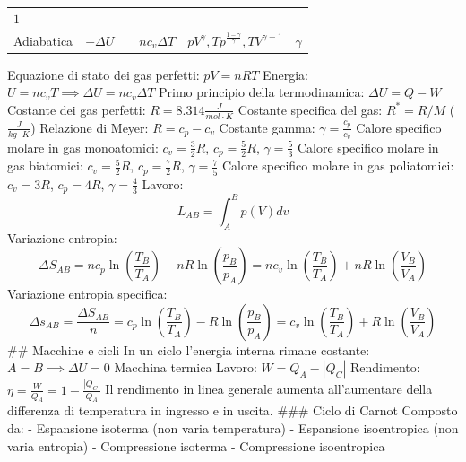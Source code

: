 \begin{longtable}[]{@{}lccccc@{}}
\begin{minipage}[t]{0.05\columnwidth}
\(1\)\strut
\end{minipage}\tabularnewline
\begin{minipage}[t]{0.07\columnwidth}\raggedright
Adiabatica\strut
\end{minipage} & \begin{minipage}[t]{0.13\columnwidth}\centering
\(-\Delta U\)\strut
\end{minipage} & \begin{minipage}[t]{0.09\columnwidth}\centering
0\strut
\end{minipage} & \begin{minipage}[t]{0.09\columnwidth}\centering
\(nc_v\Delta T\)\strut
\end{minipage} & \begin{minipage}[t]{0.39\columnwidth}\centering
\(pV^\gamma , Tp^{\frac{1-\gamma}{\gamma}}, TV^{\gamma-1}\)\strut
\end{minipage} & \begin{minipage}[t]{0.05\columnwidth}\centering
\(\gamma\)\strut
\end{minipage}\tabularnewline
\bottomrule
\end{longtable}

Equazione di stato dei gas perfetti: \(pV=nRT\) Energia:
\(U=nc_vT\implies \Delta U = nc_v\Delta T\) Primo principio della
termodinamica: \(\Delta U = Q-W\) Costante dei gas perfetti:
\(R=8.314 \frac{J}{mol\cdot K}\) Costante specifica del gas: \(R^*=R/M\)
(\(\frac{J}{kg\cdot K}\)) Relazione di Meyer: \(R=c_p-c_v\) Costante
gamma: \(\gamma=\frac{c_p}{c_v}\) Calore specifico molare in gas
monoatomici: \(c_v=\frac{3}{2}R\), \(c_p=\frac{5}{2}R\),
\(\gamma=\frac{5}{3}\) Calore specifico molare in gas biatomici:
\(c_v=\frac{5}{2}R\), \(c_p=\frac{7}{2}R\), \(\gamma=\frac{7}{5}\)
Calore specifico molare in gas poliatomici: \(c_v=3R\), \(c_p=4R\),
\(\gamma=\frac{4}{3}\) Lavoro: \[L_{AB}=\int_A^B p(V)dv\] Variazione
entropia:
\[\Delta S_{AB}=nc_p\ln{\left(\frac{T_B}{T_A}\right)}-nR\ln{\left(\frac{p_B}{p_A}\right)}=nc_v\ln{\left(\frac{T_B}{T_A}\right)}+nR\ln{\left(\frac{V_B}{V_A}\right)}\]
Variazione entropia specifica:
\[\Delta s_{AB}=\frac{\Delta S_{AB}}{n}=c_p\ln{\left(\frac{T_B}{T_A}\right)}-R\ln{\left(\frac{p_B}{p_A}\right)}=c_v\ln{\left(\frac{T_B}{T_A}\right)}+R\ln{\left(\frac{V_B}{V_A}\right)}\]
\#\# Macchine e cicli In un ciclo l'energia interna rimane costante:
\(A = B \implies \Delta U= 0\) Macchina termica Lavoro:
\(W = Q_A-|Q_C|\) Rendimento:
\(\eta =\frac{W}{Q_A}=1-\frac{|Q_C|}{Q_A}\) Il rendimento in linea
generale aumenta all'aumentare della differenza di temperatura in
ingresso e in uscita. \#\#\# Ciclo di Carnot Composto da: - Espansione
isoterma (non varia temperatura) - Espansione isoentropica (non varia
entropia) - Compressione isoterma - Compressione isoentropica

